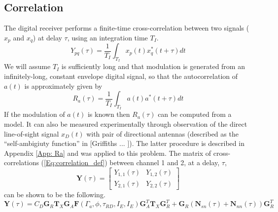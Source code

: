\documentclass[draftcls,onecolumn]{IEEEtran}  %
\begin{document}
\subsection{Correlation}
The digital receiver  performs a finite-time cross-correlation between two signals ($x_p$ and $x_q$) at delay $\tau$, using an integration time $T_I$. 
\begin{equation}
	Y_{pq}(\tau)  %
    =\frac{1}{T_I} \int_{T_I}x_p(t) x_q^*(t+\tau)dt 
    \label{Eq:correlation_def}
\end{equation}
We will assume $T_I$ is sufficiently long and that modulation is generated from an infinitely-long, constant envelope digital signal, so that the autocorrelation of $a(t)$ is approximately given by
\begin{equation}
R_a (\tau) = \frac{1}{T_I} \int_{T_I} a(t) a^*(t+\tau) dt
\end{equation}
If the modulation of $a(t)$ is known then $R_a(\tau)$ can be computed from a model.
It can also be measured experimentally through observation of the direct line-of-sight signal $x_D(t)$ with pair of directional antennas (described as the ``self-ambigiuty function'' in [Griffiths ... ]).  The latter procedure is described in Appendix \ref{App: Ra} and was applied to this problem. 
 The matrix of cross-correlations (\ref{Eq:correlation_def})  
 between channel 1 and 2, at a  delay, $\tau$, 
 \begin{equation}
 \mathbf{Y}(\tau) =  \left[ \begin{array}{cc}  Y_{1,1}(\tau) & Y_{1,2}(\tau) \\ Y_{2,1}(\tau) & Y_{2,2}(\tau)  \end{array} \right]
  \label{eqn:xcorrmatdefn}
 \end{equation}
 can be shown to be the following. 
  \begin{equation}
 \mathbf{Y}(\tau) = 
 C_D \mathbf{G}_R \mathbf{T}_X \mathbf{G}_A  \mathbf{F}(\Gamma_a, \phi, \tau_{RD}, I_E, I_E )
 \mathbf{G}_A^T \mathbf{T}_X \mathbf{G}_R^T + \mathbf{G}_R \left( \mathbf{N}_{sn}(\tau)   + \mathbf{N}_{nn}(\tau) \right)  \mathbf{G}_R^T
 \label{eqn:xcorrmat}
 \end{equation}
\end{document}
